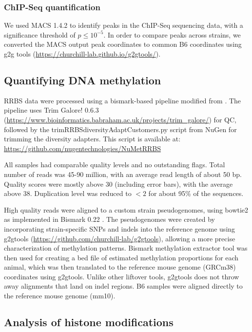 \documentclass[
  11pt,
]{article}
\begin{document}
\hypertarget{chip-seq-quantification}{%
\subsubsection{ChIP-Seq quantification}\label{chip-seq-quantification}}

We used MACS 1.4.2 \citep{pmid18798982} to identify peaks in the
ChIP-Seq sequencing data, with a significance threshold of
\(p \leq 10^{-5}\). In order to compare peaks across strains, we
converted the MACS output peak coordinates to common B6 coordinates
using g2g tools (\url{https://churchill-lab.github.io/g2gtools/}).

\hypertarget{quantifying-dna-methylation}{%
\subsection{Quantifying DNA
methylation}\label{quantifying-dna-methylation}}

RRBS data were processed using a bismark-based pipeline modified from
\citep{pmid30348905}. The pipeline uses Trim Galore! 0.6.3
(\url{https://www.bioinformatics.babraham.ac.uk/projects/trim_galore/})
for QC, followed by the trimRRBSdiversityAdaptCustomers.py script from
NuGen for trimming the diversity adapters. This script is available at:
\url{https://github.com/nugentechnologies/NuMetRRBS}

All samples had comparable quality levels and no outstanding flags.
Total number of reads was 45-90 million, with an average read length of
about 50 bp. Quality scores were mostly above 30 (including error bars),
with the average above 38. Duplication level was reduced to \(<2\) for
about 95\% of the sequences.

High quality reads were aligned to a custom strain pseudogenomes, using
bowtie2 as implemented in Bismark 0.22 \citep{pmid21493656}. The
pseudogenomes were created by incorporating strain-specific SNPs and
indels into the reference genome using g2gtools
(\url{https://github.com/churchill-lab/g2gtools}), allowing a more
precise characterization of methylation patterns. Bismark methylation
extractor tool was then used for creating a bed file of estimated
methylation proportions for each animal, which was then translated to
the reference mouse genome (GRCm38) coordinates using g2gtools. Unlike
other liftover tools, g2gtools does not throw away alignments that land
on indel regions. B6 samples were aligned directly to the reference
mouse genome (mm10).

\hypertarget{analysis-of-histone-modifications}{%
\subsection{Analysis of histone
modifications}\label{analysis-of-histone-modifications}}
\end{document}
